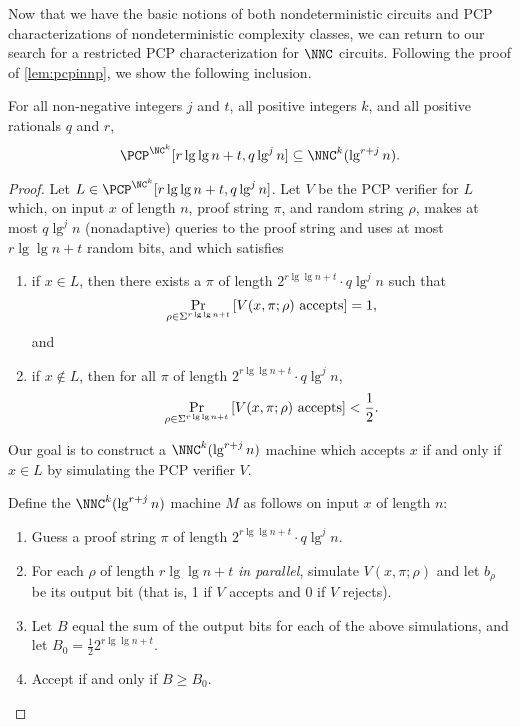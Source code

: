 \documentclass[]{article}
\begin{document}
Now that we have the basic notions of both nondeterministic circuits and PCP characterizations of nondeterministic complexity classes, we can return to our search for a restricted PCP characterization for $\NNC$ circuits.
Following the proof of \autoref{lem:pcpinnp}, we show the following inclusion.
\begin{proposition}\label{prop:pcpinnnc}
  For all non-negative integers $j$ and $t$, all positive integers $k$, and all positive rationals $q$ and $r$,
  \begin{equation*}
    \PCP^{\NC^k}[r \lg \lg n + t, q \lg^j n] \subseteq \NNC^k(\lg^{r + j} n).
  \end{equation*}
\end{proposition}
\begin{proof}
  Let $L \in \PCP^{\NC^k}[r \lg \lg n + t, q \lg^j n]$.
  Let $V$ be the PCP verifier for $L$ which, on input $x$ of length $n$, proof string $\pi$, and random string $\rho$, makes at most $q \lg^j n$ (nonadaptive) queries to the proof string and uses at most $r \lg \lg n + t$ random bits, and which satisfies
  \begin{enumerate}
  \item if $x \in L$, then there exists a $\pi$ of length $2^{r \lg \lg n + t} \cdot q \lg^j n$ such that
    \begin{equation*}
      \Pr_{\rho \in \Sigma^{r \lg \lg n + t}}{\left[V(x, \pi; \rho) \textnormal{ accepts}\right]} = 1,
    \end{equation*}
    and
  \item if $x \notin L$, then for all $\pi$ of length $2^{r \lg \lg n + t} \cdot q \lg^j n$,
    \begin{equation*}
      \Pr_{\rho \in \Sigma^{r \lg \lg n + t}}{\left[V(x, \pi; \rho) \textnormal{ accepts}\right]} < \frac{1}{2}.
    \end{equation*}
  \end{enumerate}
  Our goal is to construct a $\NNC^k(\lg^{r + j} n)$ machine which accepts $x$ if and only if $x \in L$ by simulating the PCP verifier $V$.

  Define the $\NNC^k(\lg^{r + j} n)$ machine $M$ as follows on input $x$ of length $n$:
  \begin{enumerate}
  \item Guess a proof string $\pi$ of length $2^{r \lg \lg n + t} \cdot q \lg^j n$.
  \item For each $\rho$ of length $r \lg \lg n + t$ \emph{in parallel}, simulate $V(x, \pi; \rho)$ and let $b_\rho$ be its output bit (that is, 1 if $V$ accepts and 0 if $V$ rejects).
  \item Let $B$ equal the sum of the output bits for each of the above simulations, and let $B_0 = \frac{1}{2} 2^{r \lg \lg n + t}$.
  \item Accept if and only if $B \geq B_0$.
  \end{enumerate}


\end{proof}
\end{document}
